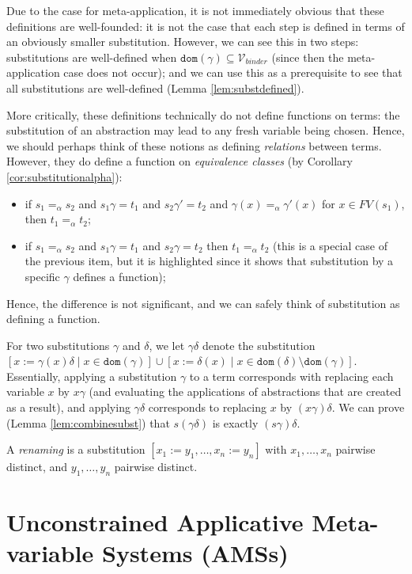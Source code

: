 \documentclass{lmcs}
\theoremstyle{theorem}\newtheorem{theorem}{Theorem}
\theoremstyle{theorem}\newtheorem{lemma}[theorem]{Lemma}
\theoremstyle{theorem}\newtheorem{corollary}[theorem]{Corollary}
\theoremstyle{definition}\newtheorem{definition}[theorem]{Definition}
\theoremstyle{definition}\newtheorem{example}[theorem]{Example}
\newcommand{\Vbound}{\mathcal{V}_{\mathit{binder}}}
\newcommand{\FV}{\mathit{FV}}
\newcommand{\domain}{\mathtt{dom}}
\newcommand{\avar}{x}
\begin{document}
Due to the case for meta-application, it is not immediately obvious that these
definitions are well-founded: it is not the case that each step is defined in
terms of an obviously smaller substitution.  However, we can see this in two
steps: substitutions are well-defined when $\domain(\gamma) \subseteq \Vbound$
(since then the meta-application case does not occur); and we can use this as a
prerequisite to see that all substitutions are well-defined (Lemma
\ref{lem:substdefined}).

More critically, these definitions technically do not define functions on terms:
the substitution of an abstraction may lead to any fresh variable being chosen.
Hence, we should perhaps think of these notions as defining \emph{relations}
between terms.  However, they do define a function on \emph{equivalence classes}
(by Corollary \ref{cor:substitutionalpha}):
\begin{itemize}
\item if $s_1 =_\alpha s_2$ and $s_1\gamma = t_1$ and $s_2\gamma' = t_2$ and
  $\gamma(x) =_\alpha \gamma'(x)$ for $x \in \FV(s_1)$, then $t_1 =_\alpha t_2$;
\item if $s_1 =_\alpha s_2$ and $s_1\gamma = t_1$ and $s_2\gamma = t_2$ then
  $t_1 =_\alpha t_2$ (this is a special case of the previous item, but it is
  highlighted since it shows that substitution by a specific $\gamma$ defines a
  function);
\end{itemize}
Hence, the difference is not significant, and we can safely think of
substitution as defining a function.

For two substitutions $\gamma$ and $\delta$, we let $\gamma\delta$ denote the substitution
$[\avar := \gamma(\avar)\delta \mid \avar \in \domain(\gamma)] \cup
[\avar := \delta(\avar) \mid \avar \in \domain(\delta) \setminus \domain(\gamma)]$.
Essentially, applying a substitution $\gamma$ to a term corresponds with replacing each variable
$\avar$ by $\avar\gamma$ (and evaluating the applications of abstractions that are created as a
result), and applying $\gamma\delta$ corresponds to replacing $\avar$ by $(\avar\gamma)\delta$.
We can prove (Lemma \ref{lem:combinesubst}) that $s(\gamma\delta)$ is exactly $(s\gamma)\delta$.

A \emph{renaming} is a substitution $[x_1:=y_1,\dots,x_n:=y_n]$ with $x_1,\dots,x_n$ pairwise
distinct, and $y_1,\dots,y_n$ pairwise distinct.


\section{Unconstrained Applicative Meta-variable Systems (AMSs)}
\end{document}
